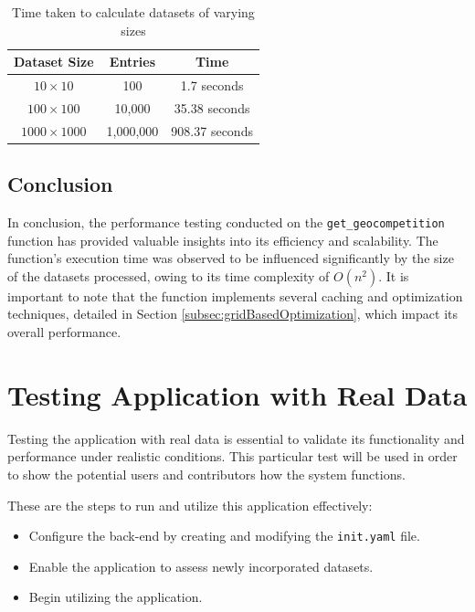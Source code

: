 \begin{table}[ht]
\centering
\begin{tabular}{|c|c|c|}
\hline
\textbf{Dataset Size} & \textbf{Entries} & \textbf{Time} \\ \hline
\multirow{1}{*}{$10\times10$} & 100 & 1.7 seconds \\ \hline
\multirow{1}{*}{$100\times100$} & 10,000 & 35.38 seconds \\ \hline
\multirow{1}{*}{$1000\times1000$} & 1,000,000 & 908.37 seconds \\ \hline
\end{tabular}
\caption{Time taken to calculate datasets of varying sizes}
\label{tab:performance}
\end{table}

\subsection{Conclusion}

In conclusion, the performance testing conducted on the \texttt{get\_geocompetition} function has provided valuable insights into its efficiency and scalability. The function's execution time was observed to be influenced significantly by the size of the datasets processed, owing to its time complexity of $O(n^2)$. It is important to note that the function implements several caching and optimization techniques, detailed in Section \ref{subsec:gridBasedOptimization}, which impact its overall performance.

\section{Testing Application with Real Data}
\label{sec:testingApplicationWithRealData}

Testing the application with real data is essential to validate its functionality and performance under realistic conditions. This particular test will be used in order to show the potential users and contributors how the system functions.

These are the steps to run and utilize this application effectively:

\begin{itemize}
    \item Configure the back-end by creating and modifying the \texttt{init.yaml} file.
    \item Enable the application to assess newly incorporated datasets.
    \item Begin utilizing the application.
\end{itemize}

